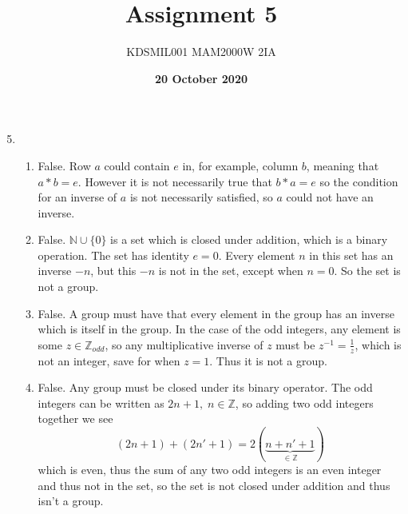 \documentclass[12pt]{article}
\title{Assignment 5}
\author{KDSMIL001 \; MAM2000W 2IA}
\date{\textbf{20 October 2020}}
\numberwithin{equation}{section}
\numberwithin{figure}{section}
\begin{document}
    \maketitle
    \begin{enumerate}
        \setcounter{enumi}{4}
        \item \begin{enumerate}
            \item False. Row $a$ could contain $e$ in, for example, column $b$, meaning that $a*b=e$. However it is not necessarily true that 
            $b*a=e$ so the condition for an inverse of $a$ is not necessarily satisfied, so $a$ could not have an inverse.

            \item False. $\mathbb{N}\cup\{0\}$ is a set which is closed under addition, which is a binary operation. The set has identity $e=0$. 
            Every element $n$ in this set has an inverse $-n$, but this $-n$ is not in the set, except when $n=0$. So the set is not a group.

            \item False. A group must have that every element in the group has an inverse which is itself in the group. In the case of the odd integers, any 
            element is some $z\in\mathbb{Z}_{odd}$, so any multiplicative inverse of $z$ must be $z^{-1}=\frac{1}{z}$, which is not an integer, save for 
            when $z=1$. Thus it is not a group. 
            
            \item False. Any group must be closed under its binary operator. The odd integers can be written as $2n+1,\; n\in\mathbb{Z}$, so adding two odd integers 
            together we see 
            \begin{equation*}
                (2n+1)+(2n'+1)=2(\underbrace{n+n'+1}_{\in\mathbb{Z}})
            \end{equation*}
            which is even, thus the sum of any two odd integers is an even integer and thus not in the set, so the set is not closed under addition and thus isn't a group. 


\end{enumerate}
\end{enumerate}
\end{document}

